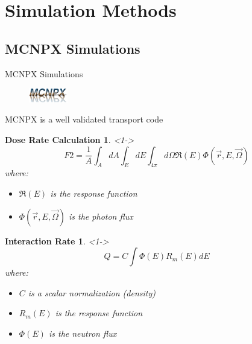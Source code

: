 
% 
%
\section{Simulation Methods}

\subsection{MCNPX Simulations}
\begin{frame}{MCNPX Simulations}
	\centering
	\begin{figure}
		\includegraphics[width=0.15\textwidth]{images/logo-mcnpx.eps}
	\end{figure}
    \small
    MCNPX is a well validated transport code \cite{pelowitz_mcnpx_2010}
\tiny
    \newtheorem{thm10}{Dose Rate Calculation}
	\begin{thm10}<1->
		$$F2 = \frac{1}{A} \int_{A}{dA}\int_{E}{dE}\int_{4\pi}{d \Omega \Re(E) \Phi(\vec{r},E,\vec{\Omega})} $$
	where:
	\begin{itemize}
		\item $\Re(E)$ is the response function
		\item $\Phi(\vec{r},E,\vec{\Omega})$ is the photon flux
	\end{itemize}
	\end{thm10}
	\newtheorem{thm11}{Interaction Rate}
	\begin{thm11}<1->
		$$Q = C \int {\Phi(E) R_m(E) dE }$$
	where:
	\begin{itemize}
		\item $C$ is a scalar normalization (density)
		\item $R_m(E)$ is the response function
		\item $\Phi(E)$ is the neutron flux
	\end{itemize}
	\end{thm11}
\end{frame}

